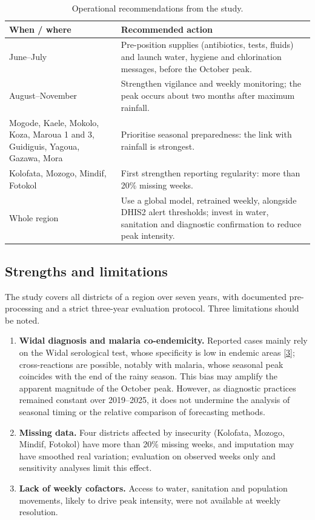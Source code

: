 \documentclass[11pt]{article}
\begin{document}
\begin{table}[!htbp]\centering\small
\caption{Operational recommendations from the study.}\label{tab:actions}
\begin{tabularx}{\linewidth}{@{}>{\raggedright\arraybackslash}p{4.3cm} L@{}}\toprule
When / where & Recommended action \\\midrule
June–July & Pre-position supplies (antibiotics, tests, fluids) and launch water, hygiene and chlorination messages, before the October peak. \\
August–November & Strengthen vigilance and weekly monitoring; the peak occurs about two months after maximum rainfall. \\
Mogode, Kaele, Mokolo, Koza, Maroua 1 and 3, Guidiguis, Yagoua, Gazawa, Mora & Prioritise seasonal preparedness: the link with rainfall is strongest. \\
Kolofata, Mozogo, Mindif, Fotokol & First strengthen reporting regularity: more than 20\% missing weeks. \\
Whole region & Use a global model, retrained weekly, alongside DHIS2 alert thresholds; invest in water, sanitation and diagnostic confirmation to reduce peak intensity. \\\bottomrule
\end{tabularx}
\end{table}

\subsection{Strengths and limitations}
The study covers all districts of a region over seven years, with documented pre-processing and a strict three-year evaluation protocol. Three limitations should be noted.

\begin{enumerate}[label=\arabic*.,leftmargin=1.6em]
\item \textbf{Widal diagnosis and malaria co-endemicity.} Reported cases mainly rely on the Widal serological test, whose specificity is low in endemic areas [\hyperlink{ref3}{3}]; cross-reactions are possible, notably with malaria, whose seasonal peak coincides with the end of the rainy season. This bias may amplify the apparent magnitude of the October peak. However, as diagnostic practices remained constant over 2019–2025, it does not undermine the analysis of seasonal timing or the relative comparison of forecasting methods.
\item \textbf{Missing data.} Four districts affected by insecurity (Kolofata, Mozogo, Mindif, Fotokol) have more than 20\% missing weeks, and imputation may have smoothed real variation; evaluation on observed weeks only and sensitivity analyses limit this effect.
\item \textbf{Lack of weekly cofactors.} Access to water, sanitation and population movements, likely to drive peak intensity, were not available at weekly resolution.
\end{enumerate}
\end{document}
